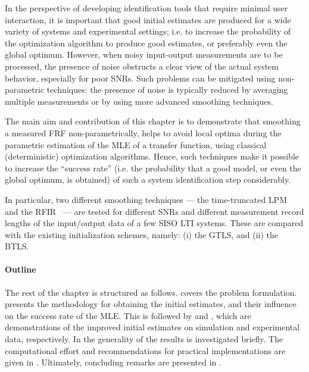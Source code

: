  In the perspective of developing identification tools that require minimal user interaction, it is important that good initial estimates are produced for a wide variety of systems and experimental settings; i.e. to increase the probability of the optimization algorithm to produce good estimates, or preferably even the global optimum.
 However, when noisy input-output measurements are to be processed, the presence of noise obstructs a clear view of the actual system behavior, especially for poor \glspl{SNR}.
 Such problems can be mitigated using non-parametric techniques: the presence of noise is typically reduced by averaging multiple measurements or by using more advanced smoothing techniques.

The main aim and contribution of this chapter is to demonstrate that smoothing a measured \gls{FRF} non-parametrically, helps to avoid local optima during the parametric estimation of the \gls{MLE} of a transfer function, using classical (deterministic) optimization algorithms.
Hence, such techniques make it possible to increase the ``success rate'' (i.e. the probability that a good model, or even the global optimum, is obtained) of such a system identification step considerably.

In particular, two different smoothing techniques --- the time-truncated \gls{LPM}~\citep{Lumori2014TIM} and the \gls{RFIR}~\citep{Pillonetto2010,Chen2012} --- are tested for different \glspl{SNR} and different measurement record lengths of the input/output data of a few \gls{SISO} \gls{LTI} systems.
These are compared with the existing initialization schemes, namely: (i) the \gls{GTLS}, and (ii) the \gls{BTLS}.

\paragraph{Outline}
The rest of the chapter is structured as follows. 
 covers the problem formulation. 
 presents the methodology for obtaining the initial estimates, and their influence on the success rate of the \gls{MLE}. 
This is followed by  and , which are demonstrations of the improved initial estimates on simulation and experimental data, respectively.
In  the generality of the results is investigated briefly.
The computational effort and recommendations for practical implementations are given in .
Ultimately, concluding remarks are presented in .

